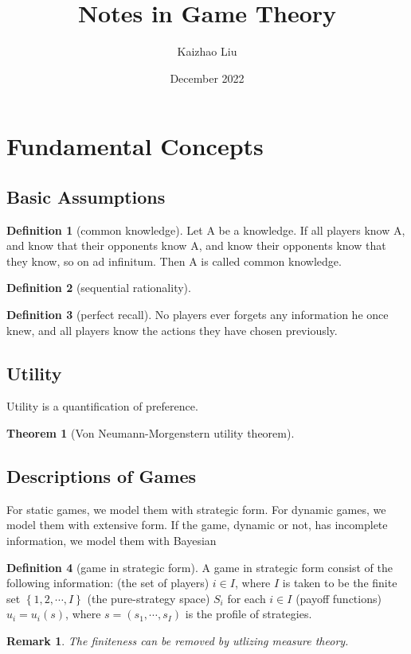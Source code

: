 \documentclass{article}
\title{Notes in Game Theory}
\author{Kaizhao Liu}
\date{December 2022}
\newtheorem{Thm}{Theorem}[section]
\newtheorem*{Rk}{Remark}
\theoremstyle{definition}
\newtheorem{Def}{Definition}[section]
\begin{document}
\maketitle
\tableofcontents
\section{Fundamental Concepts}

\subsection{Basic Assumptions}


\begin{Def}[common knowledge]
    Let A be a knowledge. If all players know A, and know that their opponents know A,
    and know their opponents know that they know, so on ad infinitum. Then A is called common knowledge.
\end{Def}


\begin{Def}[sequential rationality]
    
\end{Def}

\begin{Def}[perfect recall]
    No players ever forgets any information he once knew, and all players know the actions they have chosen previously.
\end{Def}

\subsection{Utility}
Utility is a quantification of preference.
\begin{Thm}[Von Neumann-Morgenstern utility theorem]
    
\end{Thm}


\subsection{Descriptions of Games}
For static games, we model them with strategic form. For dynamic games, we model them with extensive form. If the game, dynamic or not, has
incomplete information, we model them with Bayesian

\begin{Def}[game in strategic form]
    A game in strategic form consist of the following information:\newline 
    (the set of players) $i\in I$, where $I$ is taken to be the finite set $\left\{1,2,\cdots,I\right\}$ \newline 
    (the pure-strategy space) $S_i$ for each $i\in I$\newline 
    (payoff functions) $u_i=u_i(s)$, where $s=(s_1,\cdots,s_I)$ is the profile of strategies.
\end{Def}
\begin{Rk}
    The finiteness can be removed by utlizing measure theory.
\end{Rk}
\end{document}
